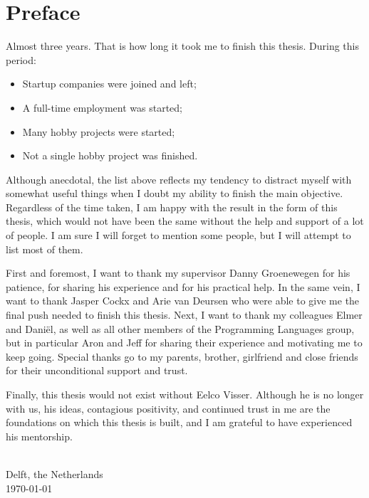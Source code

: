 
\chapter{\label{chap:Preface}Preface}

Almost three years. That is how long it took me to finish this thesis. During this period:

\begin{itemize}
 \item Startup companies were joined and left;
 \item A full-time employment was started;
 \item Many hobby projects were started;
 \item Not a single hobby project was finished.
\end{itemize}

Although anecdotal, the list above reflects my tendency to distract myself with somewhat useful things when I doubt my ability to finish the main objective.
Regardless of the time taken, I am happy with the result in the form of this thesis, which would not have been the same without the help and support of a lot of people.
I am sure I will forget to mention some people, but I will attempt to list most of them.

First and foremost, I want to thank my supervisor Danny Groenewegen for his patience, for sharing his experience and for his practical help.
In the same vein, I want to thank Jasper Cockx and Arie van Deursen who were able to give me the final push needed to finish this thesis.
Next, I want to thank my colleagues Elmer and Daniël, as well as all other members of the Programming Languages group, but in particular Aron and Jeff for sharing their experience and motivating me to keep going.
Special thanks go to my parents, brother, girlfriend and close friends for their unconditional support and trust.

Finally, this thesis would not exist without Eelco Visser.
Although he is no longer with us, his ideas, contagious positivity, and continued trust in me are the foundations on which this thesis is built, and I am grateful to have experienced his mentorship.

\vspace{1cm}
\begin{flushright}
\theauthor{}\\
Delft, the Netherlands\\
\today{}\\
\end{flushright}
